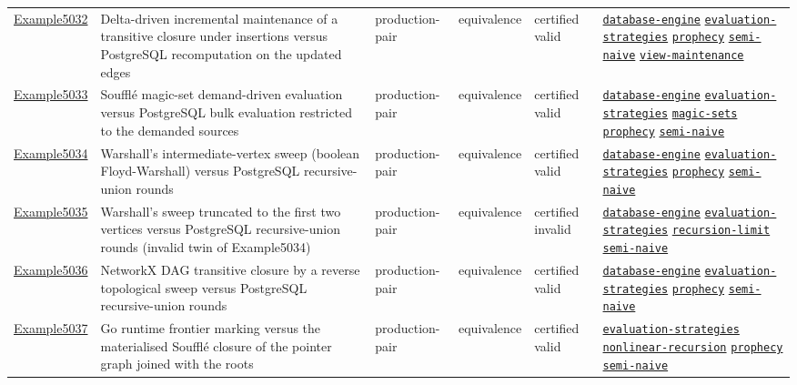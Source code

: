 \documentclass[10pt]{article}
\begin{document}
\begin{longtable}{@{}lp{}p{}p{}p{}p{}@{}}
\hyperref[case:Example5032]{Example5032} & Delta-driven incremental maintenance of a transitive closure under insertions versus PostgreSQL recomputation on the updated edges & production-pair & equivalence & certified valid & {\scriptsize \hyperref[tag:database-engine]{\texttt{database-engine}} \hyperref[tag:evaluation-strategies]{\texttt{evaluation-strategies}} \hyperref[tag:prophecy]{\texttt{prophecy}} \hyperref[tag:semi-naive]{\texttt{semi-naive}} \hyperref[tag:view-maintenance]{\texttt{view-maintenance}}} \\
\hyperref[case:Example5033]{Example5033} & Soufflé magic-set demand-driven evaluation versus PostgreSQL bulk evaluation restricted to the demanded sources & production-pair & equivalence & certified valid & {\scriptsize \hyperref[tag:database-engine]{\texttt{database-engine}} \hyperref[tag:evaluation-strategies]{\texttt{evaluation-strategies}} \hyperref[tag:magic-sets]{\texttt{magic-sets}} \hyperref[tag:prophecy]{\texttt{prophecy}} \hyperref[tag:semi-naive]{\texttt{semi-naive}}} \\
\hyperref[case:Example5034]{Example5034} & Warshall's intermediate-vertex sweep (boolean Floyd-Warshall) versus PostgreSQL recursive-union rounds & production-pair & equivalence & certified valid & {\scriptsize \hyperref[tag:database-engine]{\texttt{database-engine}} \hyperref[tag:evaluation-strategies]{\texttt{evaluation-strategies}} \hyperref[tag:prophecy]{\texttt{prophecy}} \hyperref[tag:semi-naive]{\texttt{semi-naive}}} \\
\hyperref[case:Example5035]{Example5035} & Warshall's sweep truncated to the first two vertices versus PostgreSQL recursive-union rounds (invalid twin of Example5034) & production-pair & equivalence & certified invalid & {\scriptsize \hyperref[tag:database-engine]{\texttt{database-engine}} \hyperref[tag:evaluation-strategies]{\texttt{evaluation-strategies}} \hyperref[tag:recursion-limit]{\texttt{recursion-limit}} \hyperref[tag:semi-naive]{\texttt{semi-naive}}} \\
\hyperref[case:Example5036]{Example5036} & NetworkX DAG transitive closure by a reverse topological sweep versus PostgreSQL recursive-union rounds & production-pair & equivalence & certified valid & {\scriptsize \hyperref[tag:database-engine]{\texttt{database-engine}} \hyperref[tag:evaluation-strategies]{\texttt{evaluation-strategies}} \hyperref[tag:prophecy]{\texttt{prophecy}} \hyperref[tag:semi-naive]{\texttt{semi-naive}}} \\
\hyperref[case:Example5037]{Example5037} & Go runtime frontier marking versus the materialised Soufflé closure of the pointer graph joined with the roots & production-pair & equivalence & certified valid & {\scriptsize \hyperref[tag:evaluation-strategies]{\texttt{evaluation-strategies}} \hyperref[tag:nonlinear-recursion]{\texttt{nonlinear-recursion}} \hyperref[tag:prophecy]{\texttt{prophecy}} \hyperref[tag:semi-naive]{\texttt{semi-naive}}} \\

\end{longtable}
\end{document}

